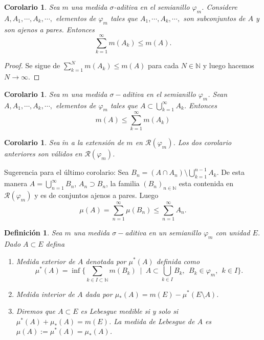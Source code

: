 \documentclass[twoside,12pt,a4 paper,openright]{book}
\newtheorem{cor}[claim]{Corolario}
\newtheorem{defi}[claim]{Definici\'on}
\begin{document}
\begin{cor}
    Sea $m$ una medida $\sigma$-aditiva en el semianillo $\varphi_m$. Considere $A, A_1,\cdots, A_k,\cdots,$ elementos de $\varphi_m$ tales que $A_1,\cdots, A_k,\cdots,$ son subconjuntos de $A$ y son ajenos a pares. Entonces
     $$ \sum_{k=1}^{\infty} m(A_k) \leq m(A).$$
\end{cor}

\begin{proof}Se sigue de 
    $\displaystyle \sum_{k=1}^{N}m(A_k) \leq m(A)$ para cada $ N\in \mathbb{N}$ y luego  hacemos $N\to \infty$.
\end{proof}
\begin{cor}
    Sea $m$ una medida $\sigma-$aditiva en el semianillo $\varphi_m$. Sean $A, A_1,\cdots, A_k,\cdots,$ elementos de $\varphi_m$ tales que $A\subset \bigcup_{k=1}^{\infty} A_k$. Entonces 
    $$m(A) \leq \sum_{k=1}^{\infty} m(A_k)$$
\end{cor}
\begin{cor}
Sea  $\tilde{m}$ a la extensi\'on de $m$ en $\mathcal{R}(\varphi_m)$. Los dos corolario anteriores son v\'alidos en $\mathcal{R}(\varphi_m)$. 
\end{cor}
Sugerencia para el \'ultimo corolario: Sea  $B_n = (A\cap A_n)\setminus\bigcup_{k=1}^{n-1} A_k$. De esta manera $A = \bigcup_{n=1}^{\infty} B_n$, $A_n \supset B_n$, la familia $(B_n)_{n\in \mathbb{N}}$ esta contenida en $\mathcal{R}(\varphi_m)$ y es de conjuntos ajenos a pares. Luego
    $$\mu(A) = \sum_{n=1}^{\infty}\mu(B_n) \leq \sum_{n=1}^{\infty}A_n .$$ 
 \begin{defi}
    Sea $m$ una medida $\sigma-$aditiva en un semianillo $\varphi_m$ con unidad $E$. Dado $A\subset E$ defina
    \begin{enumerate}
        \item Medida exterior de $A$ denotada por $\mu^*(A)$ definida como
         $$\mu^*(A) = \inf \{ \sum_{k\in I\subset\mathbb N} m(B_k) \ \mid \   A\subset \bigcup_{k\in I }     B_k, \ \  B_k\in \varphi_m,  \  \ k\in I  \}.$$ 
         \item Medida interior de $A$ dada por $\mu_*(A) = m(E) - \mu^*(E\setminus A)$.

         \item Diremos que $A\subset E$ es Lebesgue medible si y solo si $\mu^*(A) + \mu_*(A)=m(E)$. La medida de Lebesgue de $A$ es $\mu(A) := \mu^*(A) = \mu_*(A)$.
    \end{enumerate}
\end{defi}
\end{document}

